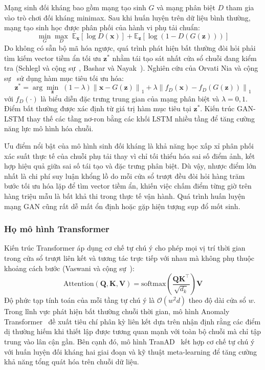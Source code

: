 Mạng sinh đối kháng bao gồm mạng tạo sinh $G$ và mạng phân biệt $D$ tham gia vào trò chơi đối kháng minimax. Sau khi huấn luyện trên dữ liệu bình thường, mạng tạo sinh học được phân phối của hành vi phụ tải chuẩn:
\begin{equation*}
    \min_{G} \max_{D} \; \mathbb{E}_{\mathbf{x}}\left[\log D(\mathbf{x})\right] + \mathbb{E}_{\mathbf{z}}\left[\log\left(1 - D(G(\mathbf{z}))\right)\right]
\end{equation*}
Do không có sẵn bộ mã hóa ngược, quá trình phát hiện bất thường đòi hỏi phải tìm kiếm vector tiềm ẩn tối ưu $\mathbf{z}^{*}$ nhằm tái tạo sát nhất cửa sổ chuỗi đang kiểm tra (Schlegl và cộng sự~\cite{anogan}, Bashar và Nayak~\cite{tanogan}). Nghiên cứu của Orvati Nia và cộng sự~\cite{orvati2026} sử dụng hàm mục tiêu tối ưu hóa:
\begin{equation*}
    \mathbf{z}^{*} = \arg\min_{\mathbf{z}} \; (1 - \lambda)\left\| \mathbf{x} - G(\mathbf{z}) \right\|_1 + \lambda \left\| f_D(\mathbf{x}) - f_D(G(\mathbf{z})) \right\|_1
\end{equation*}
với $f_D(\cdot)$ là biểu diễn đặc trưng trung gian của mạng phân biệt và $\lambda = 0{,}1$. Điểm bất thường được xác định từ giá trị hàm mục tiêu tại $\mathbf{z}^{*}$. Kiến trúc GAN-LSTM thay thế các tầng nơ-ron bằng các khối LSTM nhiều tầng để tăng cường năng lực mô hình hóa chuỗi.

Ưu điểm nổi bật của mô hình sinh đối kháng là khả năng học xấp xỉ phân phối xác suất thực tế của chuỗi phụ tải thay vì chỉ tối thiểu hóa sai số điểm ảnh, kết hợp hiệu quả giữa sai số tái tạo và đặc trưng phân biệt. Dù vậy, nhược điểm lớn nhất là chi phí suy luận khổng lồ do mỗi cửa sổ trượt đều đòi hỏi hàng trăm bước tối ưu hóa lặp để tìm vector tiềm ẩn, khiến việc chấm điểm từng giờ trên hàng triệu mẫu là bất khả thi trong thực tế vận hành. Quá trình huấn luyện mạng GAN cũng rất dễ mất ổn định hoặc gặp hiện tượng sụp đổ mốt sinh.

\subsubsection{Họ mô hình Transformer}

Kiến trúc Transformer áp dụng cơ chế tự chú ý cho phép mọi vị trí thời gian trong cửa sổ trượt liên kết và tương tác trực tiếp với nhau mà không phụ thuộc khoảng cách bước (Vaswani và cộng sự~\cite{transformer}):
\begin{equation*}
    \mathrm{Attention}(\mathbf{Q}, \mathbf{K}, \mathbf{V}) = \mathrm{softmax}\left(\frac{\mathbf{Q}\mathbf{K}^{\top}}{\sqrt{d_k}}\right)\mathbf{V}
\end{equation*}
Độ phức tạp tính toán của mỗi tầng tự chú ý là $\mathcal{O}(w^2 d)$ theo độ dài cửa sổ $w$. Trong lĩnh vực phát hiện bất thường chuỗi thời gian, mô hình Anomaly Transformer~\cite{anomaly_transformer} đề xuất tiêu chí phân kỳ liên kết dựa trên nhận định rằng các điểm dị thường hiếm khi thiết lập được tương quan mạnh với toàn bộ chuỗi mà chỉ tập trung vào lân cận gần. Bên cạnh đó, mô hình TranAD~\cite{tranad} kết hợp cơ chế tự chú ý với huấn luyện đối kháng hai giai đoạn và kỹ thuật meta-learning để tăng cường khả năng tổng quát hóa trên chuỗi dữ liệu.

